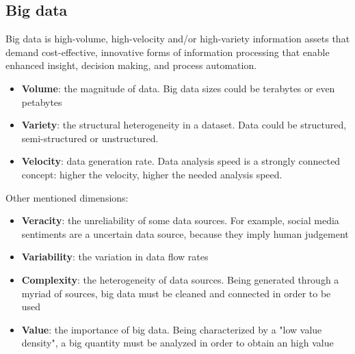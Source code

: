 \documentclass[\main/main.tex]{subfiles}
\begin{document}
\subsection{Big data}
Big data is high-volume, high-velocity and/or high-variety information assets that demand cost-effective, innovative forms of information processing that enable enhanced insight, decision making, and process automation.\cite{bigdatagartner}
\begin{itemize}
    \item \textbf{Volume}: the magnitude of data. Big data sizes could be terabytes or even petabytes
    \item \textbf{Variety}: the structural heterogeneity in a dataset. Data could be structured, semi-structured or unstructured.
    \item \textbf{Velocity}: data generation rate. Data analysis speed is a strongly connected concept: higher the velocity, higher the needed analysis speed.
\end{itemize}
Other mentioned dimensions:
\begin{itemize}
    \item \textbf{Veracity}: the unreliability of some data sources. For example, social media sentiments are a uncertain data source, because they imply human judgement
    \item \textbf{Variability}: the variation in data flow rates
    \item \textbf{Complexity}: the heterogeneity of data sources. Being generated through a myriad of sources, big data must be cleaned and connected in order to be used
    \item \textbf{Value}: the importance of big data. Being characterized by a "low value density", a big quantity must be analyzed in order to obtain an high value
\end{itemize}\cite{Gandomi2015BeyondTH}
\end{document}
